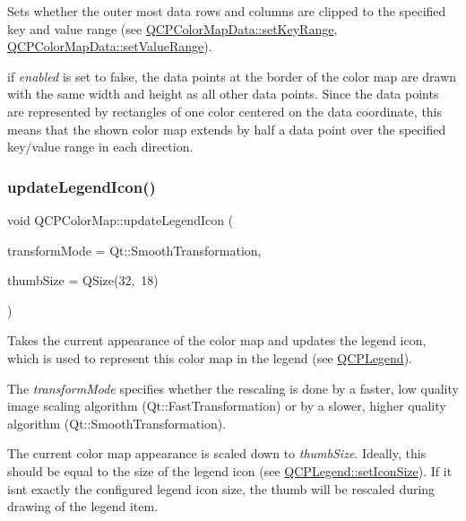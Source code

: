 Sets whether the outer most data rows and columns are clipped to the specified key and value range (see \mbox{\hyperlink{class_q_c_p_color_map_data_a0738c485f3c9df9ea1241b7a8bb6a86e}{Q\+C\+P\+Color\+Map\+Data\+::set\+Key\+Range}}, \mbox{\hyperlink{class_q_c_p_color_map_data_ada1b2680ba96a5f4175b6d341cf75d23}{Q\+C\+P\+Color\+Map\+Data\+::set\+Value\+Range}}).

if {\itshape enabled} is set to false, the data points at the border of the color map are drawn with the same width and height as all other data points. Since the data points are represented by rectangles of one color centered on the data coordinate, this means that the shown color map extends by half a data point over the specified key/value range in each direction.

\mbox{\label{class_q_c_p_color_map_a5d8158b62d55fcfeaabcb68ce0083e87}} 
\subsubsection{\texorpdfstring{update\+Legend\+Icon()}{updateLegendIcon()}}
{\footnotesize\ttfamily void Q\+C\+P\+Color\+Map\+::update\+Legend\+Icon (\begin{DoxyParamCaption}\item[{Qt\+::\+Transformation\+Mode}]{transform\+Mode = {\ttfamily Qt\+:\+:SmoothTransformation},  }\item[{const Q\+Size \&}]{thumb\+Size = {\ttfamily QSize(32,~18)} }\end{DoxyParamCaption})}

Takes the current appearance of the color map and updates the legend icon, which is used to represent this color map in the legend (see \mbox{\hyperlink{class_q_c_p_legend}{Q\+C\+P\+Legend}}).

The {\itshape transform\+Mode} specifies whether the rescaling is done by a faster, low quality image scaling algorithm (Qt\+::\+Fast\+Transformation) or by a slower, higher quality algorithm (Qt\+::\+Smooth\+Transformation).

The current color map appearance is scaled down to {\itshape thumb\+Size}. Ideally, this should be equal to the size of the legend icon (see \mbox{\hyperlink{class_q_c_p_legend_a8b0740cce488bf7010da6beda6898984}{Q\+C\+P\+Legend\+::set\+Icon\+Size}}). If it isn\textquotesingle{}t exactly the configured legend icon size, the thumb will be rescaled during drawing of the legend item.

